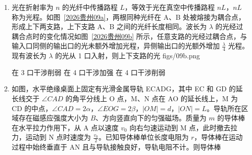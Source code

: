 \documentclass[\gkver]{gaokaozhenti}
\begin{document}
\begin{enumerate}
{在放气过程中，溢出的气体对外界做负功}
{在刚放气完到下次即将放气的过程中，发酵产生气体，罐内气体内能减小}
{在刚放气完到下次即将放气的过程中，发酵产生气体，罐内气体内能增大}


\item
光在折射率为 $n$ 的光纤中传播路程 $L$，等效于光在真空中传播路程 $nL$，$nL$ 称为光程。如图~\ref{2026贵州09a}，两根同种光纤在 A、B 处被熔接为耦合点，形成上下两支路，上下支路 A、B 之间的光纤长度相同。波长为 $\lambda$ 的光经过耦合点时的变化情况如图~\ref{2026贵州09b} 所示，任意支路的光经过耦合点，与输入口同侧的输出口的光未额外增加光程，异侧输出口的光额外增加 $\frac{\lambda}{4}$ 光程。现有波长为 $\lambda$ 的光从 1 口入射，则上下支路的光 
{figs/09b.png}

{在 3 口干涉削弱}
{在 4 口干涉加强}
{在 4 口干涉削弱}


\item
如图，水平绝缘桌面上固定有光滑金属导轨 ECADG，其中 EC 和 GD 的延长线交于 $\angle CAD$ 的角平分线上 O 点，M、N 点在 AO 的延长线上，M 为 CD 的中点，$\angle CAD=2\alpha$，$\angle EOG=2\beta$，$|OM|=d$，$|ON|=L$。导轨所在区域存在磁感应强度大小为 $B$、方向竖直向下的匀强磁场。质量为 $m$ 的导体棒在水平拉力作用下，从 A 点以速度 $v_{0}$ 向右匀速运动到 M 点，此时撤去拉力，运动到 N 点时速度为 $\frac{v_{0}}{2}$。已知导体棒单位长度电阻为 $r$，导体棒在运动过程中始终垂直于 AN 且与导轨接触良好，导轨电阻不计。则导体棒 


\end{enumerate}
\end{document}
